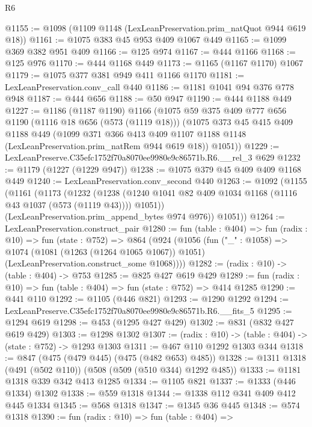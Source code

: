 \begin{lexlean}{R6}
\begin{coremodule}
@1155 := @1098 (@1109 @1148 (LexLeanPreservation.prim_natQuot @944 @619 @18))
@1161 := @1075 @383 @45 @953 @409 @1067 @449
@1165 := @1099 @369 @382 @951 @409
@1166 := @125 @974
@1167 := @444 @1166
@1168 := @125 @976
@1170 := @444 @1168 @449
@1173 := @1165 (@1167 @1170) @1067
@1179 := @1075 @377 @381 @949 @411 @1166 @1170
@1181 := LexLeanPreservation.conv_call @440
@1186 := @1181 @1041 @94 @376 @778 @948
@1187 := @444 @656
@1188 := @50 @947
@1190 := @444 @1188 @449
@1227 := @1186
    (@1187 @1190)
    @1166
    (@1075
      @59
      @375
      @409
      @777
      @656
      @1190
      (@1116 @18 @656 (@573 (@1119 @18)))
      (@1075
        @373
        @45
        @415
        @409
        @1188
        @449
        (@1099
          @371
          @366
          @413
          @409
          @1107
          @1188
          @1148
          (LexLeanPreservation.prim_natRem @944 @619 @18))
        @1051))
@1229 := LexLeanPreserve.C35efc1752f70a8070ee9980e9c86571b.R6.__rel_3 @629
@1232 := @1179 (@1227 (@1229 @947))
@1238 := @1075 @379 @45 @409 @409 @1168 @449
@1240 := LexLeanPreservation.conv_second @440
@1263 := @1092
    (@1155
      (@1161
        (@1173
          (@1232
            (@1238 (@1240 @1041 @82 @409 @1034 @1168 (@1116 @43 @1037 (@573 (@1119 @43)))) @1051))
          (LexLeanPreservation.prim_append_bytes @974 @976))
        @1051))
@1264 := LexLeanPreservation.construct_pair
@1280 := fun (table : @404) =>
  fun (radix : @10) =>
  fun (state : @752) =>
  @864
    (@924
      (@1056
        (fun ("_" : @1058) =>
        @1074
          (@1081 (@1263 (@1264 @1065 @1067)) @1051)
          (LexLeanPreservation.construct_some @1068))))
@1282 := (radix : @10) -> (table : @404) -> @753
@1285 := @825 @427 @619 @429
@1289 := fun (radix : @10) => fun (table : @404) => fun (state : @752) => @414 @1285
@1290 := @441 @110
@1292 := @1105 (@446 @821)
@1293 := @1290 @1292
@1294 := LexLeanPreserve.C35efc1752f70a8070ee9980e9c86571b.R6.__fits_5
@1295 := @1294 @619
@1298 := @453 (@1295 @427 @429)
@1302 := @831 (@832 @427 @619 @429)
@1303 := @1298 @1302
@1307 := (radix : @10) -> (table : @404) -> (state : @752) -> @1293 @1303
@1311 := @467 @110 @1292 @1303 @344
@1318 := @847 (@475 (@479 @445) (@475 (@482 @653) @485))
@1328 := @1311 @1318 (@491 (@502 @110)) (@508 (@509 (@510 @344) @1292 @485))
@1333 := @1181 @1318 @339 @342 @413 @1285
@1334 := @1105 @821
@1337 := @1333 (@446 @1334) @1302
@1338 := @559 @1318
@1344 := @1338 @112 @341 @409 @412 @445 @1334
@1345 := @568 @1318
@1347 := @1345 @36 @445
@1348 := @574 @1318
@1390 := fun (radix : @10) =>
  fun (table : @404) =>

\end{coremodule}
\end{lexlean}
